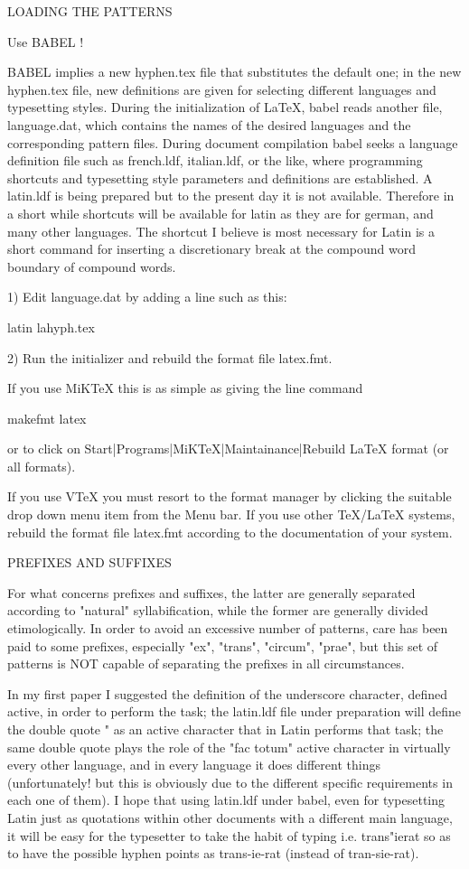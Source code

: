  LOADING THE PATTERNS

 Use BABEL !

 BABEL implies a new hyphen.tex file that substitutes the default one; in
 the new hyphen.tex file, new definitions are given for selecting different
 languages and typesetting styles. During the initialization of LaTeX,
 babel reads another  file, language.dat, which contains the names of
 the desired languages and the corresponding pattern files. During
 document compilation babel seeks a language definition file such as
 french.ldf, italian.ldf, or the like, where programming shortcuts and
 typesetting style parameters and definitions are established. A latin.ldf
 is being prepared but to the present day it is not available.
 Therefore in a short while shortcuts will be available for latin as they are
 for german, and many other languages. The shortcut I believe is most necessary
 for Latin is a short command for inserting a discretionary break at the
 compound word boundary of compound words.

 1) Edit language.dat by adding a line such as this:

 latin lahyph.tex

 2) Run the initializer and rebuild the format file latex.fmt.

    If you use MiKTeX this is as simple as giving the line command

 makefmt latex

    or to click on Start|Programs|MiKTeX|Maintainance|Rebuild LaTeX format
    (or all formats).

    If you use VTeX you must resort to the format manager by clicking the
    suitable drop down menu item from the Menu bar.
    If you use other TeX/LaTeX systems, rebuild the format file latex.fmt
    according to the documentation of your system.


 PREFIXES AND SUFFIXES

 For what concerns prefixes and suffixes, the latter are generally separated
 according to "natural" syllabification, while the former are generally
 divided etimologically. In order to avoid an excessive number of patterns,
 care has been paid to some prefixes, especially "ex", "trans",
 "circum", "prae", but this set of patterns is NOT capable of separating
 the prefixes in all circumstances.

 In my first paper I suggested the definition of the underscore character,
 defined active, in order to perform the task; the latin.ldf file under
 preparation will define the double quote " as an active character that in Latin
 performs that task; the same double quote plays the role of the "fac totum"
 active character in virtually every other language, and in every language it
 does different things (unfortunately! but this is obviously due to the
 different specific requirements in each one of them). I hope that using latin.ldf
 under babel, even for typesetting Latin just as quotations within other documents
 with a different main language, it will be easy for the typesetter to take the
 habit of typing i.e. trans"ierat so as to have the possible hyphen points as
 trans-ie-rat (instead of tran-sie-rat).
